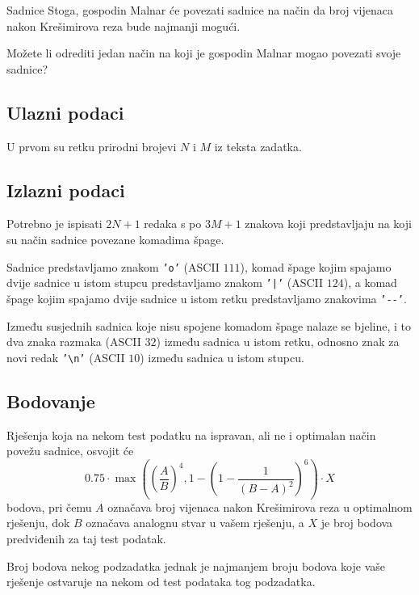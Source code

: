 \begin{statement}[
  problempoints=100,
  timelimit=3 sekunde,
  memorylimit=512 MiB,
]{Sadnice}
Stoga, gospodin Malnar će povezati sadnice na način da broj vijenaca nakon
Krešimirova reza bude najmanji mogući.

Možete li odrediti jedan način na koji je gospodin Malnar mogao povezati
svoje sadnice?

\subsection*{Ulazni podaci}
U prvom su retku prirodni brojevi $N$ i $M$ iz teksta zadatka.

\subsection*{Izlazni podaci}
Potrebno je ispisati $2N+1$ redaka s po $3M+1$ znakova koji predstavljaju
na koji su način sadnice povezane komadima špage.

Sadnice predstavljamo znakom \texttt{'o'} (ASCII $111$), komad špage kojim
spajamo dvije sadnice u istom stupcu predstavljamo znakom \texttt{'|'} (ASCII
$124$), a komad špage kojim spajamo dvije sadnice u istom retku predstavljamo
znakovima \texttt{'-{}-'}.

Između susjednih sadnica koje nisu spojene komadom
špage nalaze se bjeline, i to dva znaka razmaka (ASCII $32$) između sadnica u
istom retku, odnosno znak za novi redak \texttt{'\textbackslash{}n'} (ASCII $10$)
između sadnica u istom stupcu.

\subsection*{Bodovanje}
Rješenja koja na nekom test podatku na ispravan, ali ne i optimalan način
povežu sadnice, osvojit će
$$ 0.75 \cdot \max \left(
\left( \frac{A}{B} \right)^4,
1 - \left( 1 - \frac{1}{(B - A)^2} \right)^6
\right) \cdot X$$
bodova, pri čemu $A$ označava broj vijenaca nakon Krešimirova reza u optimalnom
rješenju, dok $B$ označava analognu stvar u vašem rješenju, a $X$ je broj bodova
predviđenih za taj test podatak.

Broj bodova nekog podzadatka jednak je najmanjem broju bodova koje vaše rješenje
ostvaruje na nekom od test podataka tog podzadatka.


\end{statement}
